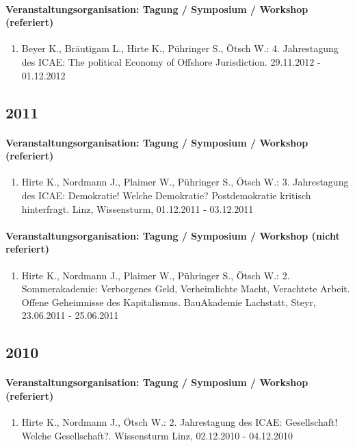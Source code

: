 \paragraph{Veranstaltungsorganisation: Tagung / Symposium / Workshop (referiert)}
\begin{enumerate}[leftmargin=*, labelsep=0.5cm]
\item Beyer K., Bräutigam L., Hirte K., Pühringer S., Ötsch W.: 4. Jahrestagung des ICAE: The political Economy of Offshore Jurisdiction. 29.11.2012 - 01.12.2012
\end{enumerate}\subsection*{2011}\paragraph{Veranstaltungsorganisation: Tagung / Symposium / Workshop (referiert)}
\begin{enumerate}[leftmargin=*, labelsep=0.5cm]
\item Hirte K., Nordmann J., Plaimer W., Pühringer S., Ötsch W.: 3. Jahrestagung des ICAE: Demokratie! Welche Demokratie? Postdemokratie kritisch hinterfragt. Linz, Wissensturm, 01.12.2011 - 03.12.2011
\end{enumerate}
\paragraph{Veranstaltungsorganisation: Tagung / Symposium / Workshop (nicht referiert)}
\begin{enumerate}[leftmargin=*, labelsep=0.5cm]
\item Hirte K., Nordmann J., Plaimer W., Pühringer S., Ötsch W.: 2. Sommerakademie: Verborgenes Geld, Verheimlichte Macht, Verachtete Arbeit. Offene Geheimnisse des Kapitalismus. BauAkademie Lachstatt, Steyr, 23.06.2011 - 25.06.2011
\end{enumerate}\subsection*{2010}\paragraph{Veranstaltungsorganisation: Tagung / Symposium / Workshop (referiert)}
\begin{enumerate}[leftmargin=*, labelsep=0.5cm]
\item Hirte K., Nordmann J., Ötsch W.: 2. Jahrestagung des ICAE: Gesellschaft! Welche Gesellschaft?. Wissensturm Linz, 02.12.2010 - 04.12.2010
\end{enumerate}
